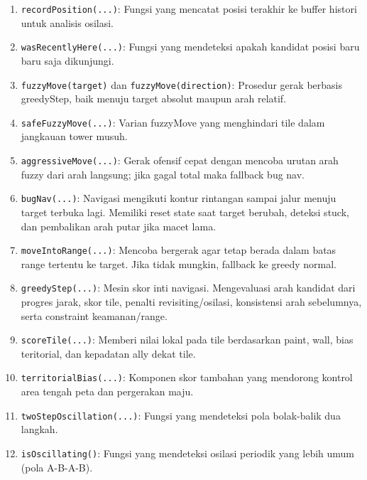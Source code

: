 \begin{enumerate}
	\item \texttt{recordPosition(...)}:
	      Fungsi yang mencatat posisi terakhir ke buffer histori untuk analisis osilasi.

	\item \texttt{wasRecentlyHere(...)}:
	      Fungsi yang mendeteksi apakah kandidat posisi baru baru saja dikunjungi.

	\item \texttt{fuzzyMove(target)} dan \texttt{fuzzyMove(direction)}:
	      Prosedur gerak berbasis greedyStep, baik menuju target absolut maupun arah relatif.

	\item \texttt{safeFuzzyMove(...)}:
	      Varian fuzzyMove yang menghindari tile dalam jangkauan tower musuh.

	\item \texttt{aggressiveMove(...)}:
	      Gerak ofensif cepat dengan mencoba urutan arah fuzzy dari arah langsung; jika gagal total maka fallback bug nav.

	\item \texttt{bugNav(...)}:
	      Navigasi mengikuti kontur rintangan sampai jalur menuju target terbuka lagi. Memiliki reset state saat target berubah, deteksi stuck, dan pembalikan arah putar jika macet lama.

	\item \texttt{moveIntoRange(...)}:
	      Mencoba bergerak agar tetap berada dalam batas range tertentu ke target. Jika tidak mungkin, fallback ke greedy normal.

	\item \texttt{greedyStep(...)}:
	      Mesin skor inti navigasi. Mengevaluasi arah kandidat dari progres jarak, skor tile, penalti revisiting/osilasi, konsistensi arah sebelumnya, serta constraint keamanan/range.

	\item \texttt{scoreTile(...)}:
	      Memberi nilai lokal pada tile berdasarkan paint, wall, bias teritorial, dan kepadatan ally dekat tile.

	\item \texttt{territorialBias(...)}:
	      Komponen skor tambahan yang mendorong kontrol area tengah peta dan pergerakan maju.

	\item \texttt{twoStepOscillation(...)}:
	      Fungsi yang mendeteksi pola bolak-balik dua langkah.

	\item \texttt{isOscillating()}:
	      Fungsi yang mendeteksi osilasi periodik yang lebih umum (pola A-B-A-B).


\end{enumerate}
